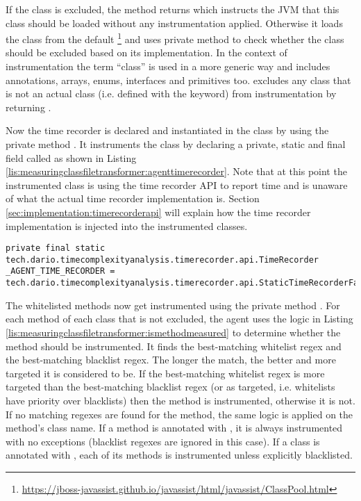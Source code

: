 \noindent If the class is excluded, the method returns  which instructs the JVM that this class should be loaded without any instrumentation applied. Otherwise it loads the class from the default \footnote{\url{https://jboss-javassist.github.io/javassist/html/javassist/ClassPool.html}} and uses private method  to check whether the class should be excluded based on its implementation. In the context of instrumentation the term \enquote{class} is used in a more generic way and includes annotations, arrays, enums, interfaces and primitives too.  excludes any class that is not an actual class (i.e. defined with the  keyword) from instrumentation by returning .

\noindent Now the time recorder is declared and instantiated in the class by using the private method . It instruments the class by declaring a private, static and final field called  as shown in Listing \ref{lis:measuringclassfiletransformer:agenttimerecorder}. Note that at this point the instrumented class is using the time recorder API to report time and is unaware of what the actual time recorder implementation is. Section \ref{sec:implementation:timerecorderapi} will explain how the time recorder implementation is injected into the instrumented classes.

\begin{lstlisting}[breaklines,caption={$\_AGENT\_TIME\_RECORDER$ initialization},label=lis:measuringclassfiletransformer:agenttimerecorder]
private final static tech.dario.timecomplexityanalysis.timerecorder.api.TimeRecorder _AGENT_TIME_RECORDER = tech.dario.timecomplexityanalysis.timerecorder.api.StaticTimeRecorderFactory.getTimeRecorder();
\end{lstlisting}

\noindent The whitelisted methods now get instrumented using the private method . For each method of each class that is not excluded, the agent uses the logic in Listing \ref{lis:measuringclassfiletransformer:ismethodmeasured} to determine whether the method should be instrumented. It finds the best-matching whitelist regex and the best-matching blacklist regex. The longer the match, the better and more targeted it is considered to be. If the best-matching whitelist regex is more targeted than the best-matching blacklist regex (or as targeted, i.e. whitelists have priority over blacklists) then the method is instrumented, otherwise it is not. If no matching regexes are found for the method, the same logic is applied on the method's class name. \noindent If a method is annotated with , it is always instrumented with no exceptions (blacklist regexes are ignored in this case). If a class is annotated with , each of its methods is instrumented unless explicitly blacklisted.

